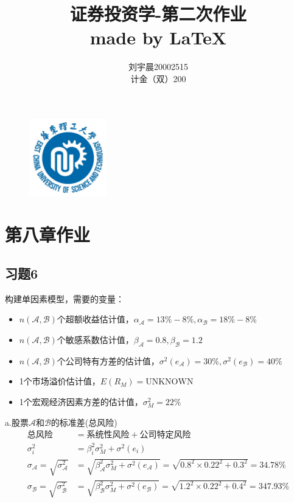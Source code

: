 \documentclass{article}
\title{\Huge 证券投资学-第二次作业    \\\large made by  \LaTeX}
\author{刘宇晨\hspace*{25pt}20002515\\计金（双）200}
\begin{document}
 
\begin{figure}[H]
    \begin{center}
        \includegraphics[width=0.3\textwidth]{logo.jpeg}
        \maketitle
    \end{center}
\end{figure}
\thispagestyle{empty}
\clearpage
{}
\section*{\center 第八章作业}
\subsection*{习题6}
\begin{spacing}{0.9}
    构建单因素模型，需要的变量：
    \begin{itemize}
        \item $n(\mathcal{A} ,\mathcal{B} )$个超额收益估计值，$\alpha_\mathcal{A}=13\%-8\% ,\alpha_\mathcal{B}=18\%-8\%$
        \item $n(\mathcal{A} ,\mathcal{B} )$个敏感系数估计值，$\beta_\mathcal{A}=0.8,\beta_\mathcal{B}=1.2 $
        \item $n(\mathcal{A} ,\mathcal{B} )$个公司特有方差的估计值，$\sigma^2(e_\mathcal{A} )=30\%,\sigma^2(e_\mathcal{B} )=40\%$
        \item 1个市场溢价估计值，$E(R_M)=\text{UNKNOWN}$
        \item 1个宏观经济因素方差的估计值，$\sigma_M^2=22\%$
    \end{itemize}
\end{spacing}


a.股票$\mathcal{A} $和$\mathcal{B} $的标准差(总风险)
\nonumber
\begin{align}
    \text{总风险}&=\text{系统性风险}+\text{公司特定风险}\\
    \sigma_i^2&=\beta_i^2\sigma_M^2+\sigma^2(e_i)\\
    \sigma_\mathcal{A}=\sqrt{ \sigma_\mathcal{A} ^2}&=\sqrt{\beta_\mathcal{A} ^2\sigma_M^2+\sigma^2(e_\mathcal{A} )}=\sqrt{0.8^2\times 0.22^2+0.3^2}=34.78\%\\
    \sigma_\mathcal{B}=\sqrt{\sigma_\mathcal{B} ^2}&=\sqrt{\beta_\mathcal{B} ^2\sigma_M^2+\sigma^2(e_\mathcal{B} )}=\sqrt{1.2^2\times 0.22^2+0.4^2}=347.93\%
\end{align}
\end{document}

